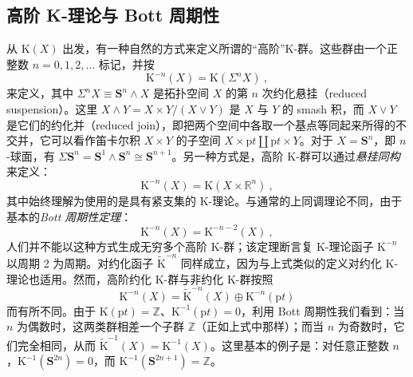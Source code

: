 \documentclass[11pt,a4paper]{ctexart}
\newcommand{\SrcRange}[2]{\marginpar{\raggedright\footnotesize 原文 p.#1}}
\begin{document}
\SrcRange{16}{16}
\subsection{高阶 K-理论与 Bott 周期性}\label{ux9ad8ux9636-k-ux7406ux8bbaux4e0e-bott-ux5468ux671fux6027}

从 \({\mathrm K}(X)\) 出发，有一种自然的方式来定义所谓的``高阶''K-群。这些群由一个正整数 \(n=0,1,2,\ldots\) 标记，并按 \[{\mathrm K}^{-n}(X)={\mathrm K}(\Sigma^nX)\ ,\] 来定义，其中 \(\Sigma^nX\equiv{\mathbf S}^n\wedge X\) 是拓扑空间 \(X\) 的第 \(n\) 次约化悬挂（reduced suspension）。这里 \(X\wedge Y= X\times Y/ (X\vee Y)\) 是 \(X\) 与 \(Y\) 的 smash 积，而 \(X\vee Y\) 是它们的约化并（reduced join），即把两个空间中各取一个基点等同起来所得的不交并，它可以看作笛卡尔积 \(X\times Y\) 的子空间 \(X\times{\mathrm pt}\amalg{\mathrm pt}\times Y\)。对于 \(X={\mathbf S}^n\)，即 \(n\)-球面，有 \(\Sigma{\mathbf S}^n={\mathbf S}^1\wedge{\mathbf S}^n\cong {\mathbf S}^{n+1}\)。另一种方式是，高阶 K-群可以通过\emph{悬挂同构}来定义： \[{\mathrm K}^{-n}(X)={\mathrm K}(X\times {\mathbb{R}}^n)\ ,\] 其中始终理解为使用的是具有紧支集的 K-理论。与通常的上同调理论不同，由于基本的\emph{Bott 周期性定理}： \[{\mathrm K}^{-n}(X)={\mathrm K}^{-n-2}(X)\ ,\] 人们并不能以这种方式生成无穷多个高阶 K-群；该定理断言复 K-理论函子 \({\mathrm K}^{-n}\) 以周期 2 为周期。对约化函子 \(\widetilde{{\mathrm K}}^{-n}\) 同样成立，因为与上式类似的定义对约化 K-理论也适用。然而，高阶约化 K-群与非约化 K-群按照 \[{\mathrm K}^{-n}(X)=\widetilde{{\mathrm K}}^{-n}(X)\oplus {\mathrm K}^{-n}({\mathrm pt})\] 而有所不同。由于 \({\mathrm K}({\mathrm pt})={\mathbb{Z}}\)、\({\mathrm K}^{-1}({\mathrm pt})=0\)，利用 Bott 周期性我们看到：当 \(n\) 为偶数时，这两类群相差一个子群 \({\mathbb{Z}}\)（正如上式中那样）；而当 \(n\) 为奇数时，它们完全相同，从而 \(\widetilde{{\mathrm K}}^{-1}(X)={\mathrm K}^{-1}(X)\)。这里基本的例子是：对任意正整数 \(n\)，\({\mathrm K}^{-1}({\mathbf S}^{2n})=0\)，而 \({\mathrm K}^{-1}({\mathbf S}^{2n+1})={\mathbb{Z}}\)。
\end{document}

